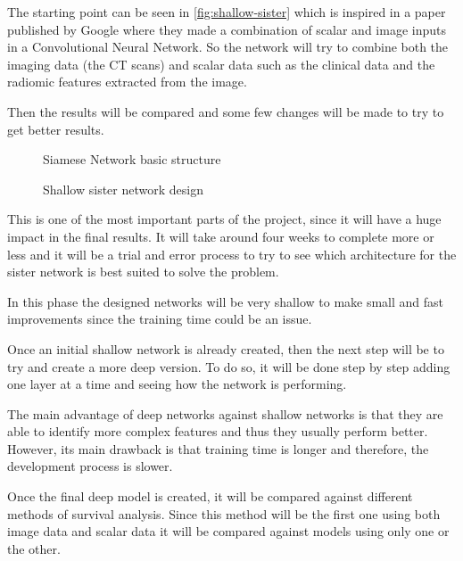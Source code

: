 The starting point can be seen in \autoref{fig:shallow-sister} which is inspired in a paper
\cite{neural:hand-eye-coordination} published by Google where they made a combination of 
scalar and image inputs in a Convolutional Neural Network. So the network will try to combine
both the imaging data (the \gls{CT} scans) and scalar data such as the clinical data and the
radiomic features extracted from the image.

Then the results will be compared and some few changes will be made to try to get better results.

\begin{figure}
  \centering
  
  \caption{Siamese Network basic structure \label{fig:siamese}}
\end{figure}

\begin{figure}
  \centering
  
  \caption{Shallow sister network design \label{fig:shallow-sister}}
\end{figure}

This is one of the most important parts of the project, since it will have a huge
impact in the final results. It will take around four weeks to complete more or less
and it will be a trial and error process to try to see which architecture for the sister
network is best suited to solve the problem.

In this phase the designed networks will be very shallow to make small and fast improvements
since the training time could be an issue.


Once an initial shallow network is already created, then the next step will be to try 
and create a more deep version. To do so, it will be done step by step adding one layer
at a time and seeing how the network is performing.

The main advantage of deep networks against shallow networks is that they are able to
identify more complex features and thus they usually perform better. However, its 
main drawback is that training time is longer and therefore, the development process is 
slower.


Once the final deep model is created, it will be compared against different methods of 
survival analysis. Since this method will be the first one using both image data and scalar 
data it will be compared against models using only one or the other. 

